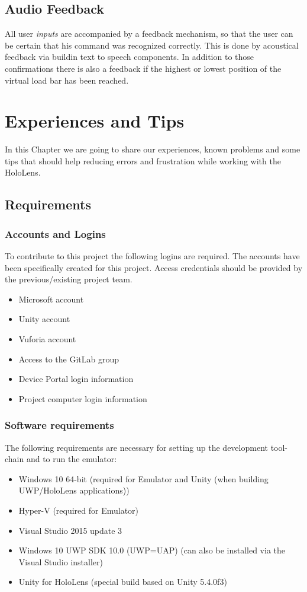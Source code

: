 \section{Audio Feedback}
All user \emph{inputs} are accompanied by a feedback mechanism, so that the user can be certain that his command was recognized correctly. This is done by acoustical feedback via buildin text to speech components. In addition to those confirmations there is also a feedback if the highest or lowest position of the virtual load bar has been reached.

\chapter{Experiences and Tips}

In this Chapter we are going to share our experiences, known problems and some tips that should help reducing errors and frustration while working with the HoloLens.

\section{Requirements}

\subsection{Accounts and Logins}
To contribute to this project the following logins are required. The accounts have been specifically created for this project. Access credentials should be provided by the previous/existing project team. 
\begin{itemize}
\item Microsoft account
\item Unity account
\item Vuforia account
\item Access to the GitLab group 
\item Device Portal login information
\item Project computer login information
\end{itemize}

\subsection{Software requirements}
The following requirements are necessary for setting up the development tool-chain and to run the emulator:
\begin{itemize}
\item Windows 10 64-bit (required for Emulator and Unity (when building UWP/HoloLens applications))
\item Hyper-V (required for Emulator)
\item Visual Studio 2015 update 3
\item Windows 10 UWP SDK 10.0 (UWP=UAP) (can also be installed via the Visual Studio installer)
\item Unity for HoloLens (special build based on Unity 5.4.0f3)
\end{itemize}

